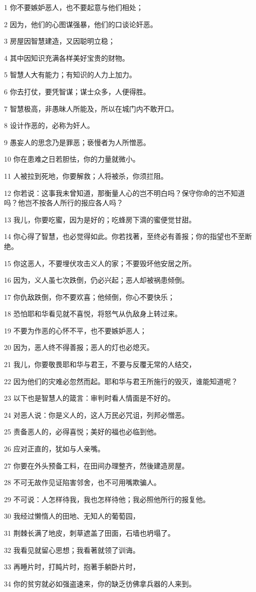 \par 1 你不要嫉妒恶人，也不要起意与他们相处；
\par 2 因为，他们的心图谋强暴，他们的口谈论奸恶。
\par 3 房屋因智慧建造，又因聪明立稳；
\par 4 其中因知识充满各样美好宝贵的财物。
\par 5 智慧人大有能力；有知识的人力上加力。
\par 6 你去打仗，要凭智谋；谋士众多，人便得胜。
\par 7 智慧极高，非愚昧人所能及，所以在城门内不敢开口。
\par 8 设计作恶的，必称为奸人。
\par 9 愚妄人的思念乃是罪恶；亵慢者为人所憎恶。
\par 10 你在患难之日若胆怯，你的力量就微小。
\par 11 人被拉到死地，你要解救；人将被杀，你须拦阻。
\par 12 你若说：这事我未曾知道，那衡量人心的岂不明白吗？保守你命的岂不知道吗？他岂不按各人所行的报应各人吗？
\par 13 我儿，你要吃蜜，因为是好的；吃蜂房下滴的蜜便觉甘甜。
\par 14 你心得了智慧，也必觉得如此。你若找著，至终必有善报；你的指望也不至断绝。
\par 15 你这恶人，不要埋伏攻击义人的家；不要毁坏他安居之所。
\par 16 因为，义人虽七次跌倒，仍必兴起；恶人却被祸患倾倒。
\par 17 你仇敌跌倒，你不要欢喜；他倾倒，你心不要快乐；
\par 18 恐怕耶和华看见就不喜悦，将怒气从仇敌身上转过来。
\par 19 不要为作恶的心怀不平，也不要嫉妒恶人；
\par 20 因为，恶人终不得善报；恶人的灯也必熄灭。
\par 21 我儿，你要敬畏耶和华与君王，不要与反覆无常的人结交，
\par 22 因为他们的灾难必忽然而起。耶和华与君王所施行的毁灭，谁能知道呢？
\par 23 以下也是智慧人的箴言：审判时看人情面是不好的。
\par 24 对恶人说：你是义人的，这人万民必咒诅，列邦必憎恶。
\par 25 责备恶人的，必得喜悦；美好的福也必临到他。
\par 26 应对正直的，犹如与人亲嘴。
\par 27 你要在外头预备工料，在田间办理整齐，然後建造房屋。
\par 28 不可无故作见证陷害邻舍，也不可用嘴欺骗人。
\par 29 不可说：人怎样待我，我也怎样待他；我必照他所行的报复他。
\par 30 我经过懒惰人的田地、无知人的葡萄园，
\par 31 荆棘长满了地皮，刺草遮盖了田面，石墙也坍塌了。
\par 32 我看见就留心思想；我看著就领了训诲。
\par 33 再睡片时，打盹片时，抱著手躺卧片时，
\par 34 你的贫穷就必如强盗速来，你的缺乏彷佛拿兵器的人来到。

